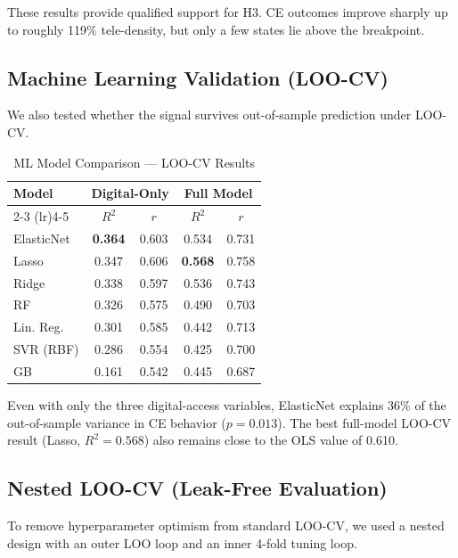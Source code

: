 \documentclass[conference]{IEEEtran}
\begin{document}
These results provide qualified support for H3. CE outcomes improve sharply up to roughly 119\% tele-density, but only a few states lie above the breakpoint.

\subsection{Machine Learning Validation (LOO-CV)}

We also tested whether the signal survives out-of-sample prediction under LOO-CV.

\begin{table}[!t]
\centering
\caption{ML Model Comparison --- LOO-CV Results}
\label{tab:ml_loocv}
\renewcommand{\arraystretch}{1.15}
\begin{tabular}{@{}p{1.8cm}cccc@{}}
\toprule
\textbf{Model} & \multicolumn{2}{c}{\textbf{Digital-Only}} & \multicolumn{2}{c}{\textbf{Full Model}} \\
\cmidrule(lr){2-3} \cmidrule(lr){4-5}
 & $R^2$ & $r$ & $R^2$ & $r$ \\
\midrule
ElasticNet & \textbf{0.364} & 0.603 & 0.534 & 0.731 \\
Lasso      & 0.347 & 0.606 & \textbf{0.568} & 0.758 \\
Ridge      & 0.338 & 0.597 & 0.536 & 0.743 \\
RF         & 0.326 & 0.575 & 0.490 & 0.703 \\
Lin. Reg.  & 0.301 & 0.585 & 0.442 & 0.713 \\
SVR (RBF)  & 0.286 & 0.554 & 0.425 & 0.700 \\
GB         & 0.161 & 0.542 & 0.445 & 0.687 \\
\bottomrule
\end{tabular}
\end{table}

Even with only the three digital-access variables, ElasticNet explains 36\% of the out-of-sample variance in CE behavior ($p = 0.013$). The best full-model LOO-CV result (Lasso, $R^2 = 0.568$) also remains close to the OLS value of 0.610.

\subsection{Nested LOO-CV (Leak-Free Evaluation)}

To remove hyperparameter optimism from standard LOO-CV, we used a nested design with an outer LOO loop and an inner 4-fold tuning loop.
\end{document}
